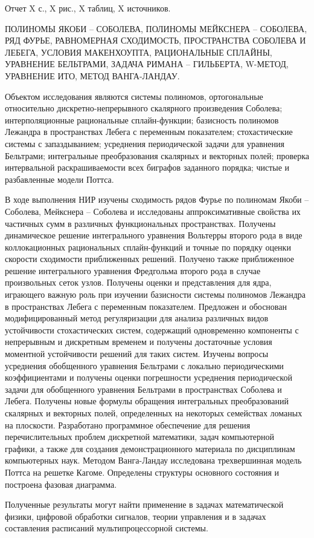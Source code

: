 \Referat %

Отчет X с., X рис., X таблиц, X источников.

\MakeUppercase{полиномы Якоби -- Соболева, полиномы Мейкснера -- Соболева, ряд Фурье, равномерная сходимость, пространства Соболева и Лебега, условия Макенхоупта, рациональные сплайны, уравнение Бельтрами, задача Римана -- Гильберта, W-метод, уравнение Ито, метод Ванга-Ландау.
}

Объектом исследования являются системы полиномов, ортогональные относительно дискретно-непрерывного скалярного произведения Соболева; интерполяционные рациональные сплайн-функции;
базисность полиномов Лежандра в пространствах Лебега с переменным показателем;
стохастические системы с запаздыванием;
усреднения периодической задачи для уравнения Бельтрами;
интегральные преобразования скалярных и векторных полей;
проверка интервальной раскрашиваемости всех биграфов заданного порядка;
чистые и разбавленные модели Поттса.

В ходе выполнения НИР изучены сходимость рядов Фурье по полиномам Якоби -- Соболева, Мейкснера -- Соболева и исследованы аппроксимативные свойства их частичных сумм в различных функциональных пространствах. Получены динамическое решение интегрального уравнения Вольтерры второго рода в виде коллокационных рациональных сплайн-функций и точные по порядку оценки скорости сходимости приближенных решений. Получено также приближенное решение интегрального уравнения Фредгольма второго рода в случае произвольных сеток узлов.
Получены оценки и представления для ядра, играющего важную роль при изучении базисности системы полиномов Лежандра в пространствах Лебега с переменным показателем.
Предложен и обоснован модифицированный метод регуляризации для анализа различных видов устойчивости стохастических систем, содержащий одновременно компоненты с непрерывным и дискретным временем и получены достаточные условия моментной устойчивости решений для таких систем.
Изучены вопросы усреднения обобщенного уравнения Бельтрами с локально периодическими коэффициентами и получены оценки погрешности усреднения периодической задачи для обобщенного уравнения Бельтрами в пространствах Соболева и Лебега.
Получены новые формулы обращения интегральных преобразований скалярных и векторных полей, определенных на некоторых семействах ломаных на плоскости.
Разработано программное обеспечение для решения перечислительных проблем дискретной математики, задач компьютерной графики, а также для создания демонстрационного материала по дисциплинам компьютерных наук.
Методом Ванга-Ландау исследована трехвершинная модель Поттса на решетке Кагоме. 
Определены структуры основного состояния и построена фазовая диаграмма. 

Полученные результаты могут найти применение в задачах математической физики, цифровой обработки сигналов, теории управления и в задачах составления расписаний мультипроцессорной системы.
